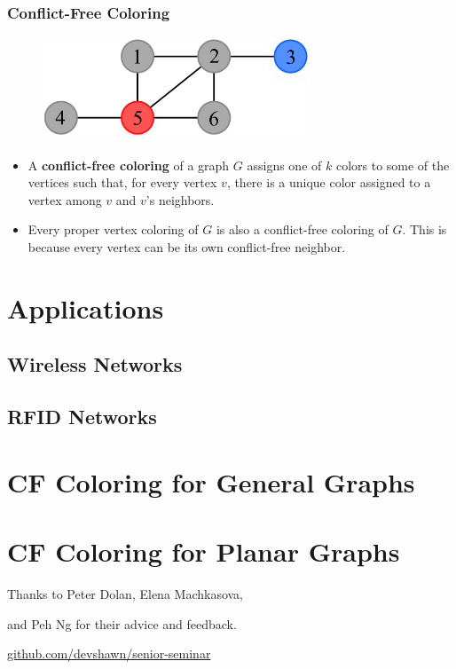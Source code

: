 \documentclass[xcolor=dvipsnames,aspectratio=1610]{beamer}
\begin{document}
  \begin{frame}
    \frametitle{Conflict-Free Coloring}

    \begin{figure}[h]
      \centering
      \includegraphics[width=8cm]{../figures/example-cfcp.pdf}
    \end{figure}

    \vfill

    \begin{itemize}
      \item A \textbf{conflict-free coloring} of a graph $G$ assigns one of $k$ colors to some of the vertices such that, for every vertex $v$, there is a unique color assigned to a vertex among $v$ and $v$'s neighbors.
      \item Every proper vertex coloring of $G$ is also a conflict-free coloring of $G$. This is because every vertex can be its own conflict-free neighbor.
    \end{itemize}
  \end{frame}


  \section{Applications}

  \subsection{Wireless Networks}

  \subsection{RFID Networks}



  \section{CF Coloring for General Graphs}

  \section{CF Coloring for Planar Graphs}

  \begin{frame}[standout]
    \centering
    {Thanks to Peter Dolan, Elena Machkasova,

    and Peh Ng for their advice and feedback.}
    \vfill
    \href{https://github.com/devshawn/senior-seminar}{github.com/devshawn/senior-seminar}
    \vfill
    \ccbyncsa{}
  \end{frame}
\end{document}
